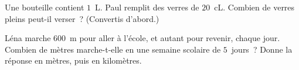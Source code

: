 \begin{exercise}[$\star\star$]\label{exo:g3:measure:10}
Une bouteille contient $1$~L. Paul remplit des verres de $20$~cL.
Combien de verres pleins peut-il verser~? (Convertis d'abord.)
\end{exercise}

\begin{exercise}[$\star\star$]\label{exo:g3:measure:11}
Léna marche $600$~m pour aller à l'école, et autant pour
revenir, chaque jour. Combien de mètres marche-t-elle en une
semaine scolaire de $5$~jours~? Donne la réponse en mètres, puis
en kilomètres.
\end{exercise}
